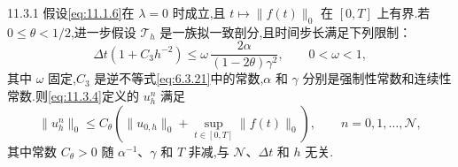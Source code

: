 \begin{theorem}[稳定性]{11.3.1}
假设\eqref{eq:11.1.6}在 \(\lambda=0\) 时成立,且 \(t\mapsto\|f(t)\|_0\) 在 \([0,T]\) 上有界.若 \(0\le\theta<1/2\),进一步假设 \(\mathcal T_h\) 是一族拟一致剖分,且时间步长满足下列限制：
\begin{equation}\label{eq:11.3.7}
  \Delta t(1+C_3h^{-2})\le
     \omega\,\frac{2\alpha}{(1-2\theta)\gamma^2},\qquad 0<\omega<1,
\end{equation}
其中 \(\omega\) 固定,\(C_3\) 是逆不等式\eqref{eq:6.3.21}中的常数,\(\alpha\) 和 \(\gamma\) 分别是强制性常数和连续性常数.则\eqref{eq:11.3.4}定义的 \(u_h^n\) 满足
\begin{equation}\label{eq:11.3.8}
  \|u_h^n\|_0\le C_\theta\left(\|u_{0,h}\|_0+
           \sup_{t\in[0,T]}\|f(t)\|_0\right),
       \qquad n=0,1,\ldots,\mathcal N,
\end{equation}
其中常数 \(C_\theta>0\) 随 \(\alpha^{-1}\)、\(\gamma\) 和 \(T\) 非减,与 \(\mathcal N\)、\(\Delta t\) 和 \(h\) 无关.
\end{theorem}

